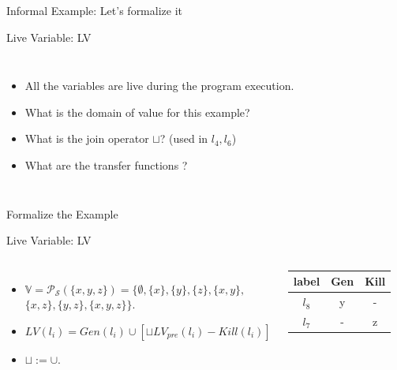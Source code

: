 \begin{frame}{Informal Example: Let's formalize it}
\begin{exampleblock}{Live Variable: LV}
	\begin{columns}
		\begin{itemize}
			\small
			\item All the variables are live during the program execution. 
			\item What is the domain of value for this example?
			\item What is the join operator $\sqcup$? (used in $l_4, l_6$)
			\item What are the transfer functions ?
		\end{itemize}
		
		
	\end{columns}	
\end{exampleblock}
\end{frame}


\begin{frame}{Formalize the Example}
\begin{exampleblock}{Live Variable: LV}
	\begin{columns}
		\column{0.45\linewidth}
		\begin{itemize}
			\small
			\item $\mathbb{V} = \mathcal{P_S}( \{x,y,z\} ) = \{\emptyset, \{x\}, \{y\}, \{z\}, \{x,y\},$\\ $\{x,z\},\{y,z\}, \{x,y,z\} \}$. 
			\item $LV(l_i)= Gen(l_i) \cup [ \sqcup LV_{pre}(l_i)-Kill(l_i) ] $
		    \item $\sqcup := \cup$.
		\end{itemize}
	\begin{tabular}{c|c|c}
		label & Gen & Kill \\
		\hline
		$l_8$ & y & - \\
		\hline
		$l_7$ & - & z \\
		\hline
	\end{tabular}
		
		\column{0.55\linewidth}
		
	\end{columns}	
\end{exampleblock}
\end{frame}



